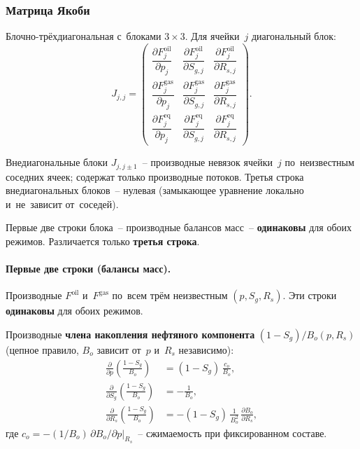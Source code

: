 \documentclass[12pt,a4paper]{article}
\begin{document}
\subsubsection{Матрица Якоби}\label{sssec:jacobian}

Блочно-трёхдиагональная с~блоками $3\times 3$. Для ячейки~$j$
диагональный блок:
\begin{equation}\label{eq:jacobian_block}
  J_{j,j} = \begin{pmatrix}
    \dfrac{\partial F_j^{\text{oil}}}{\partial p_j} &
    \dfrac{\partial F_j^{\text{oil}}}{\partial S_{g,j}} &
    \dfrac{\partial F_j^{\text{oil}}}{\partial R_{s,j}} \\[10pt]
    \dfrac{\partial F_j^{\text{gas}}}{\partial p_j} &
    \dfrac{\partial F_j^{\text{gas}}}{\partial S_{g,j}} &
    \dfrac{\partial F_j^{\text{gas}}}{\partial R_{s,j}} \\[10pt]
    \dfrac{\partial F_j^{\text{eq}}}{\partial p_j} &
    \dfrac{\partial F_j^{\text{eq}}}{\partial S_{g,j}} &
    \dfrac{\partial F_j^{\text{eq}}}{\partial R_{s,j}}
  \end{pmatrix}.
\end{equation}

Внедиагональные блоки $J_{j,j\pm1}$~-- производные невязок ячейки~$j$
по~неизвестным соседних ячеек; содержат только производные потоков.
Третья строка внедиагональных блоков~-- нулевая (замыкающее уравнение
локально и~не~зависит от~соседей).

Первые две строки блока~-- производные балансов масс~-- \textbf{одинаковы}
для обоих режимов. Различается только \textbf{третья строка}.

\paragraph{Первые две строки (балансы масс).}

Производные $F^{\text{oil}}$ и~$F^{\text{gas}}$ по~всем трём
неизвестным $(p, S_g, R_s)$. Эти строки \textbf{одинаковы} для
обоих режимов.

Производные \textbf{члена накопления нефтяного компонента}
$(1-S_g)/B_o(p, R_s)$ (цепное правило, $B_o$ зависит от~$p$
и~$R_s$ независимо):
\begin{align}
  \frac{\partial}{\partial p}\left(\frac{1-S_g}{B_o}\right)
    &= (1-S_g)\,\frac{c_o}{B_o},
     \label{eq:daccum_oil_dp} \\[4pt]
  \frac{\partial}{\partial S_g}\left(\frac{1-S_g}{B_o}\right)
    &= -\frac{1}{B_o},
     \label{eq:daccum_oil_dSg} \\[4pt]
  \frac{\partial}{\partial R_s}\left(\frac{1-S_g}{B_o}\right)
    &= -(1-S_g)\,\frac{1}{B_o^2}\,\frac{\partial B_o}{\partial R_s},
     \label{eq:daccum_oil_dRs}
\end{align}
где $c_o = -(1/B_o)\,\partial B_o/\partial p|_{R_s}$~-- сжимаемость
при фиксированном составе.
\end{document}

